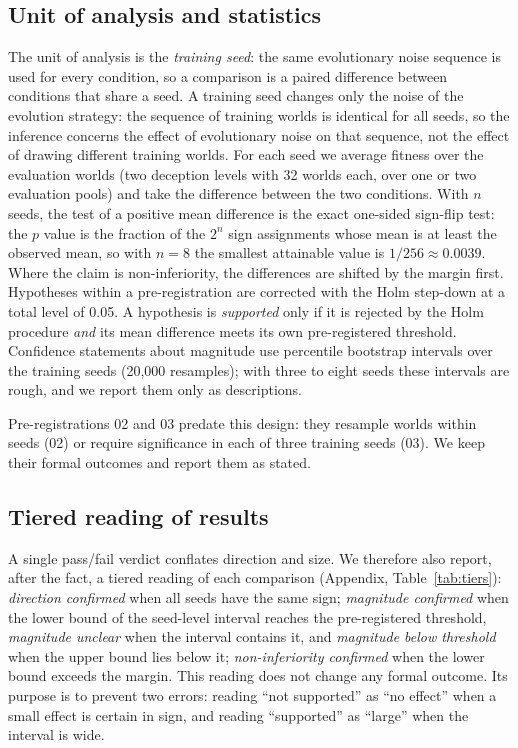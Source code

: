 \subsection{Unit of analysis and statistics}
The unit of analysis is the \emph{training seed}: the same evolutionary noise sequence is used for every condition, so a comparison is a paired difference between conditions that share a seed. A training seed changes only the noise of the evolution strategy: the sequence of training worlds is identical for all seeds, so the inference concerns the effect of evolutionary noise on that sequence, not the effect of drawing different training worlds. For each seed we average fitness over the evaluation worlds (two deception levels with 32 worlds each, over one or two evaluation pools) and take the difference between the two conditions. With $n$ seeds, the test of a positive mean difference is the exact one-sided sign-flip test: the $p$ value is the fraction of the $2^n$ sign assignments whose mean is at least the observed mean, so with $n=8$ the smallest attainable value is $1/256\approx 0.0039$. Where the claim is non-inferiority, the differences are shifted by the margin first. Hypotheses within a pre-registration are corrected with the Holm step-down at a total level of 0.05. A hypothesis is \emph{supported} only if it is rejected by the Holm procedure \emph{and} its mean difference meets its own pre-registered threshold. Confidence statements about magnitude use percentile bootstrap intervals over the training seeds (20,000 resamples); with three to eight seeds these intervals are rough, and we report them only as descriptions.

Pre-registrations 02 and 03 predate this design: they resample worlds within seeds (02) or require significance in each of three training seeds (03). We keep their formal outcomes and report them as stated.

\subsection{Tiered reading of results}
A single pass/fail verdict conflates direction and size. We therefore also report, after the fact, a tiered reading of each comparison (Appendix, Table~\ref{tab:tiers}): \emph{direction confirmed} when all seeds have the same sign; \emph{magnitude confirmed} when the lower bound of the seed-level interval reaches the pre-registered threshold, \emph{magnitude unclear} when the interval contains it, and \emph{magnitude below threshold} when the upper bound lies below it; \emph{non-inferiority confirmed} when the lower bound exceeds the margin. This reading does not change any formal outcome. Its purpose is to prevent two errors: reading ``not supported'' as ``no effect'' when a small effect is certain in sign, and reading ``supported'' as ``large'' when the interval is wide.

